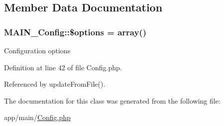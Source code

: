 \subsection{Member Data Documentation}
\hypertarget{classMAIN__Config_a25b93ec03bb1cffdfaf33b9f9b60e853}{
\subsubsection[{\$options}]{\setlength{\rightskip}{0pt plus 5cm}MAIN\_\-Config::\$options = array()}}
\label{dc/d96/classMAIN__Config_a25b93ec03bb1cffdfaf33b9f9b60e853}
Configuration options 

Definition at line 42 of file Config.php.

Referenced by updateFromFile().

The documentation for this class was generated from the following file:\begin{DoxyCompactItemize}
\item 
app/main/\hyperlink{Config_8php}{Config.php}\end{DoxyCompactItemize}
